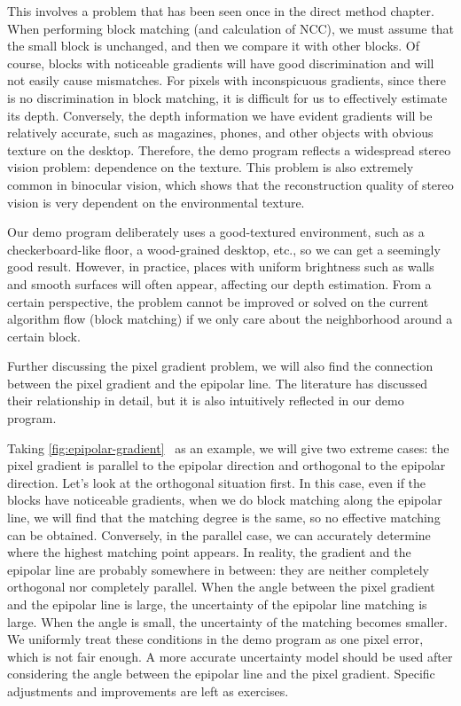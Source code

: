 This involves a problem that has been seen once in the direct method chapter. When performing block matching (and calculation of NCC), we must assume that the small block is unchanged, and then we compare it with other blocks. Of course, blocks with noticeable gradients will have good discrimination and will not easily cause mismatches. For pixels with inconspicuous gradients, since there is no discrimination in block matching, it is difficult for us to effectively estimate its depth. Conversely, the depth information we have evident gradients will be relatively accurate, such as magazines, phones, and other objects with obvious texture on the desktop. Therefore, the demo program reflects a widespread stereo vision problem: dependence on the texture. This problem is also extremely common in binocular vision, which shows that the reconstruction quality of stereo vision is very dependent on the environmental texture.

Our demo program deliberately uses a good-textured environment, such as a checkerboard-like floor, a wood-grained desktop, etc., so we can get a seemingly good result. However, in practice, places with uniform brightness such as walls and smooth surfaces will often appear, affecting our depth estimation. From a certain perspective, the problem cannot be improved or solved on the current algorithm flow (block matching) if we only care about the neighborhood around a certain block.

Further discussing the pixel gradient problem, we will also find the connection between the pixel gradient and the epipolar line. The literature \cite{Engel2013} has discussed their relationship in detail, but it is also intuitively reflected in our demo program.

Taking \autoref{fig:epipolar-gradient}~ as an example, we will give two extreme cases: the pixel gradient is parallel to the epipolar direction and orthogonal to the epipolar direction. Let's look at the orthogonal situation first. In this case, even if the blocks have noticeable gradients, when we do block matching along the epipolar line, we will find that the matching degree is the same, so no effective matching can be obtained. Conversely, in the parallel case, we can accurately determine where the highest matching point appears. In reality, the gradient and the epipolar line are probably somewhere in between: they are neither completely orthogonal nor completely parallel. When the angle between the pixel gradient and the epipolar line is large, the uncertainty of the epipolar line matching is large. When the angle is small, the uncertainty of the matching becomes smaller. We uniformly treat these conditions in the demo program as one pixel error, which is not fair enough. A more accurate uncertainty model should be used after considering the angle between the epipolar line and the pixel gradient. Specific adjustments and improvements are left as exercises.

